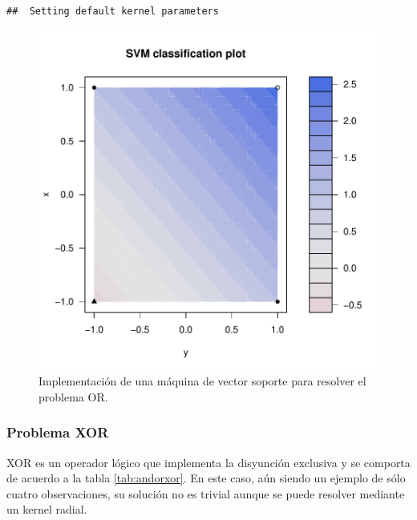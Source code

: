 \documentclass[12pt,spanish,a4paper]{article}
\newenvironment{Shaded}{\begin{snugshade}}{\end{snugshade}}
\newcommand{\KeywordTok}[1]{\textcolor[rgb]{0.13,0.29,0.53}{\textbf{#1}}}
\newcommand{\DataTypeTok}[1]{\textcolor[rgb]{0.13,0.29,0.53}{#1}}
\newcommand{\FloatTok}[1]{\textcolor[rgb]{0.00,0.00,0.81}{#1}}
\newcommand{\CommentTok}[1]{\textcolor[rgb]{0.56,0.35,0.01}{\textit{#1}}}
\newcommand{\OperatorTok}[1]{\textcolor[rgb]{0.81,0.36,0.00}{\textbf{#1}}}
\newcommand{\NormalTok}[1]{#1}
\numberwithin{equation}{section}
\begin{document}
\begin{verbatim}
##  Setting default kernel parameters
\end{verbatim}

\begin{Shaded}
\end{Shaded}

\begin{figure}[h]

{\centering \includegraphics[width=0.65\linewidth]{graphics/svm/or-1} 

}

\caption{Implementación de una máquina de vector soporte para resolver el problema OR.}\label{fig:or}
\end{figure}

\subsubsection{Problema XOR}\label{problema-xor}

XOR es un operador lógico que implementa la disyunción exclusiva y se
comporta de acuerdo a la tabla \ref{tab:andorxor}. En este caso, aún
siendo un ejemplo de sólo cuatro observaciones, su solución no es
trivial aunque se puede resolver mediante un kernel radial.
\end{document}
